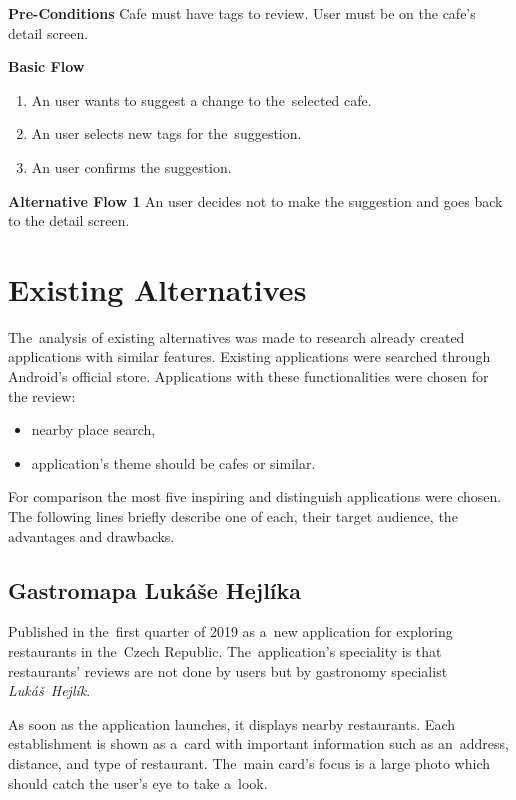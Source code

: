 \newpara
\noindent \textbf{Pre-Conditions} Cafe must have tags to review.  User must be on the cafe's detail screen.

\newpara
\noindent \textbf{Basic Flow}

\begin{enumerate}
    \item An user wants to suggest a change to the~selected cafe.
    \item An user selects new tags for the~suggestion. 
    \item An user confirms the suggestion.
\end{enumerate}

\noindent \textbf{Alternative Flow 1} An user decides not to make the suggestion and goes back to the detail screen.


\section{Existing Alternatives}
The~analysis of existing alternatives was made to research already created applications with similar features. Existing applications were searched through Android's official store. Applications with these functionalities were chosen for the review:

\begin{itemize}
    \item nearby place search,
    \item application's theme should be cafes or similar.
\end{itemize}

For comparison the most five inspiring and distinguish applications were chosen. The following lines briefly describe one of each, their target audience, the advantages and drawbacks. 

\subsection{Gastromapa Lukáše Hejlíka}
Published in the~first quarter of 2019 as a~new application for exploring restaurants in the~Czech Republic. The~application's speciality is that restaurants' reviews are not done by users but by gastronomy specialist \textit{Lukáš~Hejlík}.

As soon as the application launches, it displays nearby restaurants. Each establishment is shown as a~card with important information such as an~address, distance, and type of restaurant. The~main card's focus is a large photo which should catch the user's eye to take a~look. 


